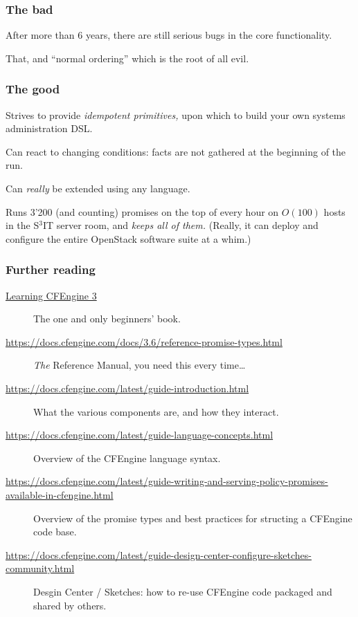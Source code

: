 \documentclass[english,serif,mathserif,usenames,dvipsnames]{beamer}
\begin{document}
\begin{frame}[fragile]
  \frametitle{The bad}

  After more than 6 years, there are still serious bugs in the core
  functionality.


  \+ \small That, and ``normal ordering'' which is the root of all
  evil.
\end{frame}


\begin{frame}
  \frametitle{The good}
  Strives to provide \emph{idempotent primitives,} upon which to build
  your own systems administration DSL.

  \+ Can react to changing conditions: facts are not gathered at the
  beginning of the run.

  \+ Can \emph{really} be extended using any language.

  \+ Runs 3'200 (and counting) promises on the top of every hour on
  $O(100)$ hosts in the S${}^3$IT server room, and \emph{keeps all of
    them.} (Really, it can deploy and configure the entire OpenStack
  software suite at a whim.)
\end{frame}


\appendix

\begin{frame}[fragile]
  \frametitle{Further reading}
  \footnotesize
  \begin{description}
    \item[\href{http://shop.oreilly.com/product/0636920022022.do}{Learning CFEngine 3}] The one and only beginners' book.
  \item[\url{https://docs.cfengine.com/docs/3.6/reference-promise-types.html}]
    \emph{The} Reference Manual, you need this every time\ldots
  \item[\url{https://docs.cfengine.com/latest/guide-introduction.html}]
    What the various components are, and how they interact.
  \item[\url{https://docs.cfengine.com/latest/guide-language-concepts.html}]
    Overview of the CFEngine language syntax.
  \item[\url{https://docs.cfengine.com/latest/guide-writing-and-serving-policy-promises-available-in-cfengine.html}]
    Overview of the promise types and best practices for structing a
    CFEngine code base.
  \item[\url{https://docs.cfengine.com/latest/guide-design-center-configure-sketches-community.html}]
    Desgin Center / Sketches: how to re-use CFEngine code packaged and shared by others.
  \end{description}
\end{frame}
\end{document}
